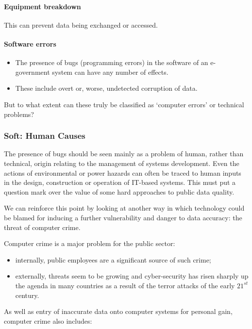 \paragraph*{Equipment breakdown} This can prevent data being exchanged or accessed.


\paragraph*{Software errors}
\begin{itemize}
	\item The presence of bugs (programming errors) in the software of an e-government system can have any number of effects. 
	\item These include overt or, worse, undetected corruption of data.
\end{itemize}


\noindent But to what extent can these truly be classified as `computer errors’ or technical problems? 

\subsubsection[Human Causes]{Soft: Human Causes}
The presence of bugs should be seen mainly as a problem of human, rather than technical, origin relating to the management of systems development. Even the actions of environmental or power hazards can often be traced to human inputs in the design, construction or operation of IT-based systems. This must put a question mark over the value of some hard approaches to public data quality.

We can reinforce this point by looking at another way in which technology could be blamed for inducing a further vulnerability and danger to data accuracy: the threat of computer crime.

Computer crime is a major problem for the public sector: 

\begin{itemize}
	\item internally, public employees are a significant source of such crime; 
	\item externally, threats seem to be growing and cyber-security has risen sharply up the agenda in many countries as a result of the terror attacks of the early $ 21^{st} $ century.
\end{itemize}


As well as entry of inaccurate data onto computer systems for personal gain, computer crime also includes:


